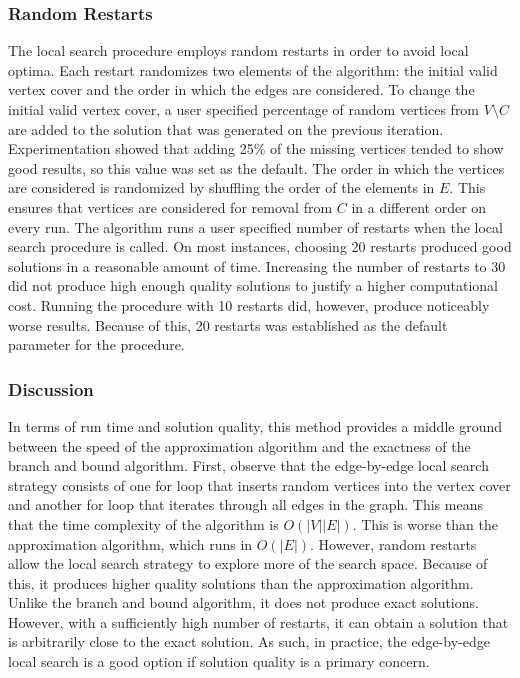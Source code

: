 \documentclass{sig-alternate-05-2015}
\begin{document}
\subsubsection{Random Restarts}
The local search procedure employs random restarts in order to avoid local optima. Each restart randomizes two elements of the algorithm: the initial valid vertex cover and the order in which the edges are considered. To change the initial valid vertex cover, a user specified percentage of random vertices from $V \setminus C$ are added to the solution that was generated on the previous iteration. Experimentation showed that adding 25\% of the missing vertices tended to show good results, so this value was set as the default. The order in which the vertices are considered is randomized by shuffling the order of the elements in $E$. This ensures that vertices are considered for removal from $C$ in a different order on every run. The algorithm runs a user specified number of restarts when the local search procedure is called. On most instances, choosing 20 restarts produced good solutions in a reasonable amount of time. Increasing the number of restarts to 30 did not produce high enough quality solutions to justify a higher computational cost. Running the procedure with 10 restarts did, however, produce noticeably worse results. Because of this, 20 restarts was established as the default parameter for the procedure.
\subsubsection{Discussion}
In terms of run time and solution quality, this method provides a middle ground between the speed of the approximation algorithm and the exactness of the branch and bound algorithm. First, observe that the edge-by-edge local search strategy consists of one for loop that inserts random vertices into the vertex cover and another for loop that iterates through all edges in the graph. This means that the time complexity of the algorithm is $O(|V||E|)$. This is worse than the approximation algorithm, which runs in $O(|E|)$. However, random restarts allow the local search strategy to explore more of the search space. Because of this, it produces higher quality solutions than the approximation algorithm. Unlike the branch and bound algorithm, it does not produce exact solutions. However, with a sufficiently high number of restarts, it can obtain a solution that is arbitrarily close to the exact solution. As such, in practice, the edge-by-edge local search is a good option if solution quality is a primary concern.
\end{document}
